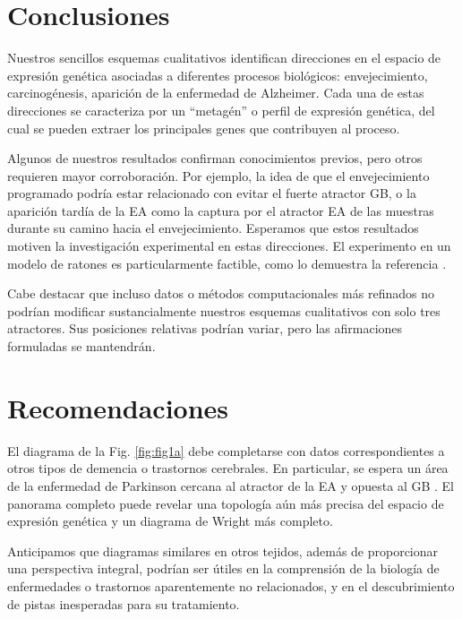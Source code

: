 \chapter*{Conclusiones}\label{conclutions}
\onehalfspacing

Nuestros sencillos esquemas cualitativos identifican direcciones en el espacio de expresión genética asociadas a diferentes procesos biológicos: envejecimiento, carcinogénesis, aparición de la enfermedad de Alzheimer. Cada una de estas direcciones se caracteriza por un ``metagén'' o perfil de expresión genética, del cual se pueden extraer los principales genes que contribuyen al proceso.

Algunos de nuestros resultados confirman conocimientos previos, pero otros requieren mayor corroboración. Por ejemplo, la idea de que el envejecimiento programado podría estar relacionado con evitar el fuerte atractor GB, o la aparición tardía de la EA como la captura por el atractor EA de las muestras durante su camino hacia el envejecimiento. Esperamos que estos resultados motiven la investigación experimental en estas direcciones. El experimento en un modelo de ratones es particularmente factible, como lo demuestra la referencia \cite{hahn2023atlas}.

Cabe destacar que incluso datos o métodos computacionales más refinados no podrían modificar sustancialmente nuestros esquemas cualitativos con solo tres atractores. Sus posiciones relativas podrían variar, pero las afirmaciones formuladas se mantendrán.

\chapter*{Recomendaciones}\label{recomendations}



El diagrama de la Fig. \ref{fig:fig1a} debe completarse con datos correspondientes a otros tipos de demencia o trastornos cerebrales. En particular, se espera un área de la enfermedad de Parkinson cercana al atractor de la EA y opuesta al GB \cite{Mencke_2020}. El panorama completo puede revelar una topología aún más precisa del espacio de expresión genética y un diagrama de Wright más completo.

Anticipamos que diagramas similares en otros tejidos, además de proporcionar una perspectiva integral, podrían ser útiles en la comprensión de la biología de enfermedades o trastornos aparentemente no relacionados, y en el descubrimiento de pistas inesperadas para su tratamiento.
